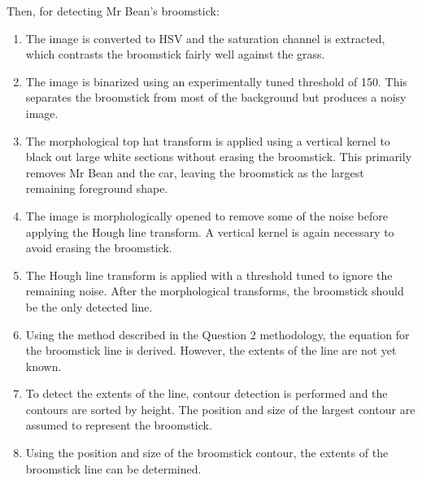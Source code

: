 Then, for detecting Mr Bean's broomstick:
\begin{enumerate}
  \item The image is converted to HSV and the saturation channel is extracted, which contrasts the broomstick fairly well against the grass.

  \item The image is binarized using an experimentally tuned threshold of 150. This separates the broomstick from most of the background but produces a noisy image.

  \item The morphological top hat transform is applied using a vertical kernel to black out large white sections without erasing the broomstick. This primarily removes Mr Bean and the car, leaving the broomstick as the largest remaining foreground shape.

  \item The image is morphologically opened to remove some of the noise before applying the Hough line transform. A vertical kernel is again necessary to avoid erasing the broomstick.

  \item The Hough line transform is applied with a threshold tuned to ignore the remaining noise. After the morphological transforms, the broomstick should be the only detected line.

  \item Using the method described in the Question 2 methodology, the equation for the broomstick line is derived. However, the extents of the line are not yet known.

  \item To detect the extents of the line, contour detection is performed and the contours are sorted by height. The position and size of the largest contour are assumed to represent the broomstick.

  \item Using the position and size of the broomstick contour, the extents of the broomstick line can be determined.

\end{enumerate}

